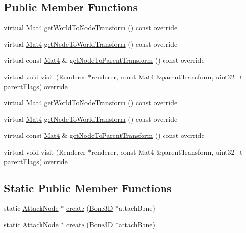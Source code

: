 \subsection*{Public Member Functions}
\begin{DoxyCompactItemize}
\item 
virtual \hyperlink{classMat4}{Mat4} \hyperlink{classAttachNode_a983b98880a9e8b42dcf78720f4fae50e}{get\+World\+To\+Node\+Transform} () const override
\item 
virtual \hyperlink{classMat4}{Mat4} \hyperlink{classAttachNode_acb93bdd6d5c0e981b081513d3e307b49}{get\+Node\+To\+World\+Transform} () const override
\item 
virtual const \hyperlink{classMat4}{Mat4} \& \hyperlink{classAttachNode_acff1e6467b97ca416e45af09c28028d6}{get\+Node\+To\+Parent\+Transform} () const override
\item 
virtual void \hyperlink{classAttachNode_a0781a31350ac165126c852540d7de7da}{visit} (\hyperlink{classRenderer}{Renderer} $\ast$renderer, const \hyperlink{classMat4}{Mat4} \&parent\+Transform, uint32\+\_\+t parent\+Flags) override
\item 
virtual \hyperlink{classMat4}{Mat4} \hyperlink{classAttachNode_a566ef52d5a8c5f036322a4fb5f63c668}{get\+World\+To\+Node\+Transform} () const override
\item 
virtual \hyperlink{classMat4}{Mat4} \hyperlink{classAttachNode_a53970668bcd205b385e4dd0ae2af8039}{get\+Node\+To\+World\+Transform} () const override
\item 
virtual const \hyperlink{classMat4}{Mat4} \& \hyperlink{classAttachNode_a0b751dd5e5c67cada4ab1e27f67f8a71}{get\+Node\+To\+Parent\+Transform} () const override
\item 
virtual void \hyperlink{classAttachNode_a34dd14d134d83f3c5458bf4ea94361fe}{visit} (\hyperlink{classRenderer}{Renderer} $\ast$renderer, const \hyperlink{classMat4}{Mat4} \&parent\+Transform, uint32\+\_\+t parent\+Flags) override
\end{DoxyCompactItemize}
\subsection*{Static Public Member Functions}
\begin{DoxyCompactItemize}
\item 
static \hyperlink{classAttachNode}{Attach\+Node} $\ast$ \hyperlink{classAttachNode_aaff0bb8854efd2f675e35cfd6f82e6d5}{create} (\hyperlink{classBone3D}{Bone3D} $\ast$attach\+Bone)
\item 
static \hyperlink{classAttachNode}{Attach\+Node} $\ast$ \hyperlink{classAttachNode_ab3e6006a938a97f1d3b8f1e531c3da50}{create} (\hyperlink{classBone3D}{Bone3D} $\ast$attach\+Bone)
\end{DoxyCompactItemize}
